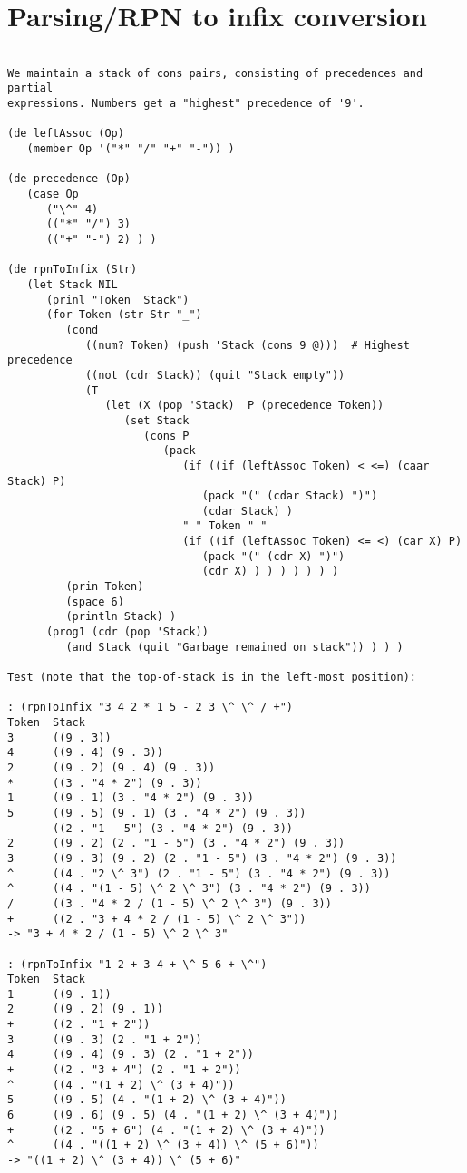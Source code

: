 \section*{Parsing/RPN to infix conversion}

\begin{verbatim}

We maintain a stack of cons pairs, consisting of precedences and partial
expressions. Numbers get a "highest" precedence of '9'.

(de leftAssoc (Op)
   (member Op '("*" "/" "+" "-")) )

(de precedence (Op)
   (case Op
      ("\^" 4)
      (("*" "/") 3)
      (("+" "-") 2) ) )

(de rpnToInfix (Str)
   (let Stack NIL
      (prinl "Token  Stack")
      (for Token (str Str "_")
         (cond
            ((num? Token) (push 'Stack (cons 9 @)))  # Highest precedence
            ((not (cdr Stack)) (quit "Stack empty"))
            (T
               (let (X (pop 'Stack)  P (precedence Token))
                  (set Stack
                     (cons P
                        (pack
                           (if ((if (leftAssoc Token) < <=) (caar Stack) P)
                              (pack "(" (cdar Stack) ")")
                              (cdar Stack) )
                           " " Token " "
                           (if ((if (leftAssoc Token) <= <) (car X) P)
                              (pack "(" (cdr X) ")")
                              (cdr X) ) ) ) ) ) ) )
         (prin Token)
         (space 6)
         (println Stack) )
      (prog1 (cdr (pop 'Stack))
         (and Stack (quit "Garbage remained on stack")) ) ) )

Test (note that the top-of-stack is in the left-most position):

: (rpnToInfix "3 4 2 * 1 5 - 2 3 \^ \^ / +")
Token  Stack
3      ((9 . 3))
4      ((9 . 4) (9 . 3))
2      ((9 . 2) (9 . 4) (9 . 3))
*      ((3 . "4 * 2") (9 . 3))
1      ((9 . 1) (3 . "4 * 2") (9 . 3))
5      ((9 . 5) (9 . 1) (3 . "4 * 2") (9 . 3))
-      ((2 . "1 - 5") (3 . "4 * 2") (9 . 3))
2      ((9 . 2) (2 . "1 - 5") (3 . "4 * 2") (9 . 3))
3      ((9 . 3) (9 . 2) (2 . "1 - 5") (3 . "4 * 2") (9 . 3))
^      ((4 . "2 \^ 3") (2 . "1 - 5") (3 . "4 * 2") (9 . 3))
^      ((4 . "(1 - 5) \^ 2 \^ 3") (3 . "4 * 2") (9 . 3))
/      ((3 . "4 * 2 / (1 - 5) \^ 2 \^ 3") (9 . 3))
+      ((2 . "3 + 4 * 2 / (1 - 5) \^ 2 \^ 3"))
-> "3 + 4 * 2 / (1 - 5) \^ 2 \^ 3"

: (rpnToInfix "1 2 + 3 4 + \^ 5 6 + \^")
Token  Stack
1      ((9 . 1))
2      ((9 . 2) (9 . 1))
+      ((2 . "1 + 2"))
3      ((9 . 3) (2 . "1 + 2"))
4      ((9 . 4) (9 . 3) (2 . "1 + 2"))
+      ((2 . "3 + 4") (2 . "1 + 2"))
^      ((4 . "(1 + 2) \^ (3 + 4)"))
5      ((9 . 5) (4 . "(1 + 2) \^ (3 + 4)"))
6      ((9 . 6) (9 . 5) (4 . "(1 + 2) \^ (3 + 4)"))
+      ((2 . "5 + 6") (4 . "(1 + 2) \^ (3 + 4)"))
^      ((4 . "((1 + 2) \^ (3 + 4)) \^ (5 + 6)"))
-> "((1 + 2) \^ (3 + 4)) \^ (5 + 6)"

\end{verbatim}

